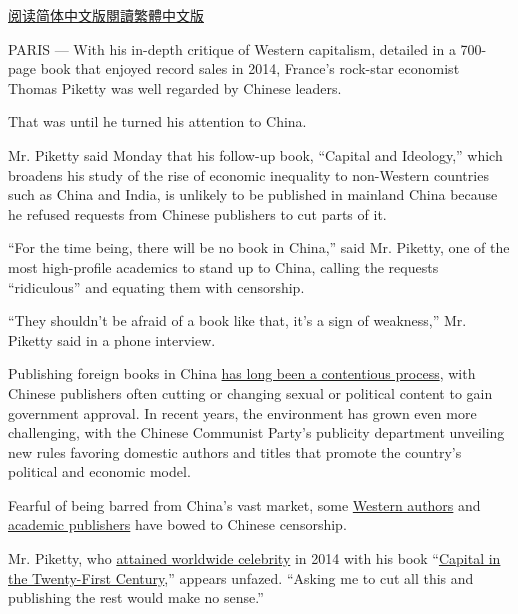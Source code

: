 \href{https://cn.nytimes3xbfgragh.onion/world/20200902/thomas-piketty-china/}{阅读简体中文版}\href{https://cn.nytimes3xbfgragh.onion/world/20200902/thomas-piketty-china/zh-hant/}{閱讀繁體中文版}

PARIS --- With his in-depth critique of Western capitalism, detailed in
a 700-page book that enjoyed record sales in 2014, France's rock-star
economist Thomas Piketty was well regarded by Chinese leaders.

That was until he turned his attention to China.

Mr. Piketty said Monday that his follow-up book, ``Capital and
Ideology,'' which broadens his study of the rise of economic inequality
to non-Western countries such as China and India, is unlikely to be
published in mainland China because he refused requests from Chinese
publishers to cut parts of it.

``For the time being, there will be no book in China,'' said Mr.
Piketty, one of the most high-profile academics to stand up to China,
calling the requests ``ridiculous'' and equating them with censorship.

``They shouldn't be afraid of a book like that, it's a sign of
weakness,'' Mr. Piketty said in a phone interview.

Publishing foreign books in China
\href{https://www.nytimes3xbfgragh.onion/2019/12/27/business/us-china-books-trade-war.html}{has
long been a contentious process}, with Chinese publishers often cutting
or changing sexual or political content to gain government approval. In
recent years, the environment has grown even more challenging, with the
Chinese Communist Party's publicity department unveiling new rules
favoring domestic authors and titles that promote the country's
political and economic model.

Fearful of being barred from China's vast market, some
\href{https://www.nytimes3xbfgragh.onion/2013/10/20/world/asia/authors-accept-censors-rules-to-sell-in-china.html}{Western
authors} and
\href{https://www.nytimes3xbfgragh.onion/2017/11/01/world/asia/china-springer-nature-censorship.html}{academic
publishers} have bowed to Chinese censorship.

Mr. Piketty, who
\href{https://www.nytimes3xbfgragh.onion/2014/04/27/fashion/Thomas-Piketty-the-Economist-Behind-Capital-in-the-Twenty-First-Century-sensation.html}{attained
worldwide celebrity} in 2014 with his book
``\href{https://www.nytimes3xbfgragh.onion/2015/08/03/books/review-the-economics-of-inequality-by-thomas-piketty.html}{Capital
in the Twenty-First Century},'' appears unfazed. ``Asking me to cut all
this and publishing the rest would make no sense.''


